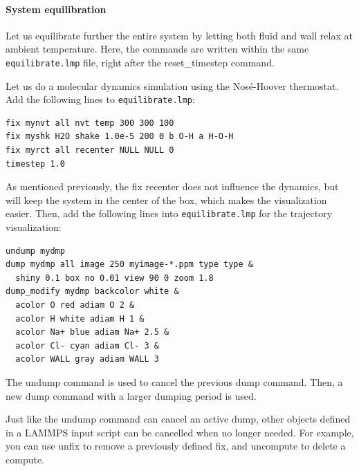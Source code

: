 \documentclass[9pt,tutorial]{livecoms}
\newcommand{\lmpcmd}[1]{\colorbox{listing}{\textcolor{command}{\small{#1}}}} %
\newcommand{\flecmd}[1]{\textcolor{command}{\texttt{#1}}} %
\begin{document}

\paragraph{System equilibration}

Let us equilibrate further the entire system by letting both fluid and {\color{blue}wall}
relax at ambient temperature.  Here, the commands are written within the same
\flecmd{equilibrate.lmp} file, right after the \lmpcmd{reset\_timestep} command.

{\color{blue} Let us do a molecular dynamics simulation using the Nosé-Hoover
thermostat.}  Add the following lines to \flecmd{equilibrate.lmp}:
\begin{lstlisting}
fix mynvt all nvt temp 300 300 100
fix myshk H2O shake 1.0e-5 200 0 b O-H a H-O-H
fix myrct all recenter NULL NULL 0
timestep 1.0
\end{lstlisting}
As mentioned previously, the \lmpcmd{fix recenter} does not influence the dynamics,
but will keep the system in the center of the box, which makes the
visualization easier.  Then, add the following lines into \flecmd{equilibrate.lmp}
for the trajectory visualization:
\begin{lstlisting}
undump mydmp
dump mydmp all image 250 myimage-*.ppm type type &
  shiny 0.1 box no 0.01 view 90 0 zoom 1.8
dump_modify mydmp backcolor white &
  acolor O red adiam O 2 &
  acolor H white adiam H 1 &
  acolor Na+ blue adiam Na+ 2.5 &
  acolor Cl- cyan adiam Cl- 3 &
  acolor WALL gray adiam WALL 3
\end{lstlisting}
The \lmpcmd{undump} command is used to cancel the previous \lmpcmd{dump} command.
Then, a new \lmpcmd{dump} command with a larger dumping period is used.

\begin{note}
{\color{blue}
Just like the \lmpcmd{undump} command can cancel an active \lmpcmd{dump}, other
objects defined in a LAMMPS input script can be cancelled when no longer needed.
For example, you can use \lmpcmd{unfix} to remove a previously defined \lmpcmd{fix}, and
\lmpcmd{uncompute} to delete a \lmpcmd{compute}.}
\end{note}
\end{document}

